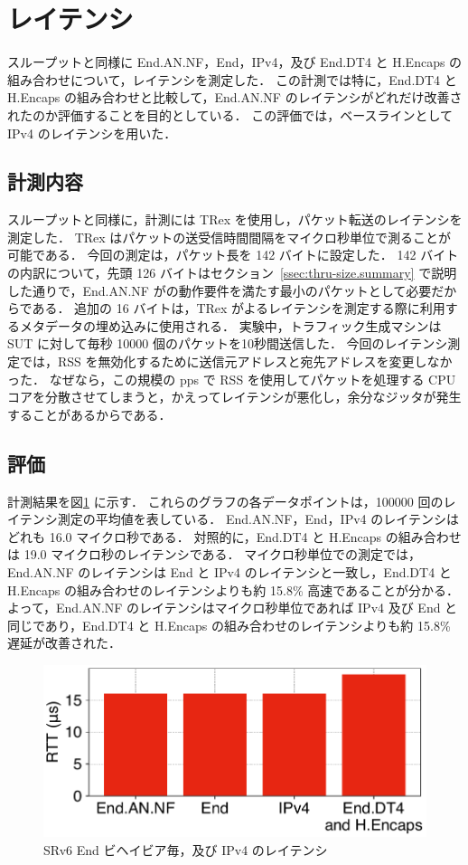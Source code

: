 \section{レイテンシ}
\label{sec:eval.rtt}
スループットと同様に End.AN.NF，End，IPv4，及び End.DT4 と H.Encaps の組み合わせについて，レイテンシを測定した．
この計測では特に，End.DT4 と H.Encaps の組み合わせと比較して，End.AN.NF のレイテンシがどれだけ改善されたのか評価することを目的としている．
この評価では，ベースラインとして IPv4 のレイテンシを用いた．

\subsection{計測内容}
\label{ssec:rtt.summary}
スループットと同様に，計測には TRex を使用し，パケット転送のレイテンシを測定した．
TRex はパケットの送受信時間間隔をマイクロ秒単位で測ることが可能である．
今回の測定は，パケット長を 142 バイトに設定した．
142 バイトの内訳について，先頭 126 バイトはセクション~\ref{ssec:thru-size.summary} で説明した通りで，End.AN.NF がの動作要件を満たす最小のパケットとして必要だからである．
追加の 16 バイトは，TRex がよるレイテンシを測定する際に利用するメタデータの埋め込みに使用される．
実験中，トラフィック生成マシンは SUT に対して毎秒 10000 個のパケットを10秒間送信した．
今回のレイテンシ測定では，RSS を無効化するために送信元アドレスと宛先アドレスを変更しなかった．
なぜなら，この規模の pps で RSS を使用してパケットを処理する CPU コアを分散させてしまうと，かえってレイテンシが悪化し，余分なジッタが発生することがあるからである．

\subsection{評価}
\label{ssec:rtt.eval}
計測結果を図\ref{fig:rtt} に示す．
これらのグラフの各データポイントは，100000 回のレイテンシ測定の平均値を表している．
End.AN.NF，End，IPv4 のレイテンシはどれも 16.0 マイクロ秒である．
対照的に，End.DT4 と H.Encaps の組み合わせは 19.0 マイクロ秒のレイテンシである．
マイクロ秒単位での測定では，End.AN.NF のレイテンシは End と IPv4 のレイテンシと一致し，End.DT4 と H.Encaps の組み合わせのレイテンシよりも約 15.8\% 高速であることが分かる．
よって，End.AN.NF のレイテンシはマイクロ秒単位であれば IPv4 及び End と同じであり，End.DT4 と H.Encaps の組み合わせのレイテンシよりも約 15.8\% 遅延が改善された．

\begin{figure}[t]
  \centering
  \includegraphics[width=0.95\linewidth]{img/latency.pdf}
  \caption{SRv6 End ビヘイビア毎，及び IPv4 のレイテンシ}
  \label{fig:rtt}
\end{figure}